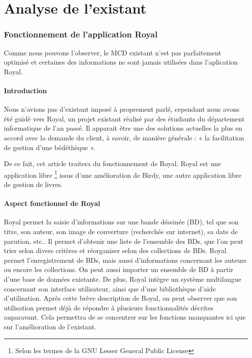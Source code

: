 \part{Analyse de l'existant}


\section{Fonctionnement de l'application Royal}

Comme nous pouvons l'observer, le MCD existant n'est pas parfaitement optimisé et certaines des informations ne sont jamais utilisées dans l'aplication Royal. 

\subsection{Introduction}
Nous n'avions pas d'existant imposé à proprement parlé, cependant nous avons été guidé vers Royal, un projet existant réalisé par des étudiants du département informatique de l'an passé.
Il apparait être une des solutions actuelles la plus en accord avec la demande du client, à savoir, de manière générale : « la facilitation de gestion d'une bédéthèque ».

De ce fait, cet article traitera du fonctionnement de Royal.
Royal est une application 
libre \footnote{Selon les termes de la GNU Lesser General Public License}
issus d'une amélioration de Birdy, une autre application libre de gestion de livres.

\subsection{Aspect fonctionnel de Royal}
Royal permet la saisie d'informations sur une bande déssinée (BD), tel que son titre, son auteur, son image de couverture (recherchée sur internet), sa date de parution, etc..
Il permet d'obtenir une liste de l'ensemble des BDs, que l'on peut trier selon divers critères et réorganiser selon des collections de BDs.
Royal permet l'enregistrement de BDs, mais aussi d'informations concernant les auteurs ou encore les collections.
On peut aussi importer un ensemble de BD à partir d'une base de données existante.
De plus, Royal intègre un système multilangue concernant son interface utilisateur, ainsi que d'une bibliothèque d'aide d'utilisation.
Après cette brève description de Royal, on peut observer que son utilisation permet déjà de répondre à plusieurs fonctionnalités décrites auparavant. Cela permettra de se concentrer sur les fonctions manquantes ici que sur l'amélioration de l'existant.

